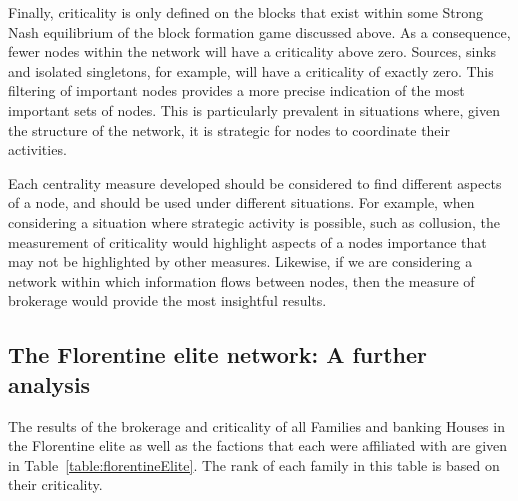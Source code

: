 Finally, criticality is only defined on the blocks that exist within some Strong Nash equilibrium of the block formation game discussed above. As a consequence, fewer nodes within the network will have a criticality above zero. Sources, sinks and isolated singletons, for example, will have a criticality of exactly zero. This filtering of important nodes provides a more precise indication of the most important sets of nodes. This is particularly prevalent in situations where, given the structure of the network, it is strategic for nodes to coordinate their activities.

Each centrality measure developed should be considered to find different aspects of a node, and should be used under different situations. For example, when considering a situation where strategic activity is possible, such as collusion, the measurement of criticality would highlight aspects of a nodes importance that may not be highlighted by other measures. Likewise, if we are considering a network within which information flows between nodes, then the measure of brokerage would provide the most insightful results.

\subsection{The Florentine elite network: A further analysis}

The results of the brokerage and criticality of all Families and banking Houses in the Florentine elite as well as the factions that each were affiliated with are given in Table~\ref{table:florentineElite}. The rank of each family in this table is based on their criticality.


